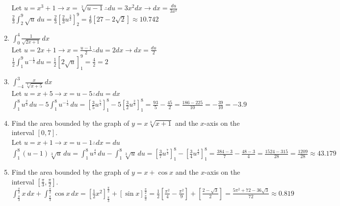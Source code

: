 \documentclass[10pt, letterpaper]{report}
\begin{document}
\begin{enumerate}
    Let $u=x^{3}+1\rightarrow x=\sqrt[3]{u-1}\therefore du=3x^{2}dx\rightarrow dx=\frac{du}{3x^2}$ \\

    $\frac{2}{3}\int_{2}^{9}{\sqrt{u}}\,du=
    \frac{2}{3}[\frac{2}{3}u^{\frac{3}{2}}]_{2}^{9}=
    \frac{4}{9}[27-2\sqrt{2}]\approx10.742$ \\

  \item{$\int_{0}^{4}\frac{1}{\sqrt{2x+1}}\,dx$} \\

    Let $u=2x+1\rightarrow x=\frac{u-1}{2}\therefore du=2dx\rightarrow dx=\frac{du}{2}$ \\
    $\frac{1}{2}\int_{1}^{9}{u^{-\frac{1}{2}}}\,du=
    \frac{1}{2}[2\sqrt{u}]_{1}^{9}=
    \frac{4}{2}=2$ \\

  \item{$\int_{-4}^{3}{\frac{x}{\sqrt[3]{x+5}}}\,dx$} \\

    Let $u=x+5\rightarrow x=u-5\therefore du=dx$ \\

    $\int_{1}^{8}{u^{\frac{2}{3}}}\,du-5\int_{1}^{8}{u^{-\frac{1}{3}}}\,du=
    [\frac{3}{5}u^{\frac{5}{3}}]_{1}^{8}-5[\frac{3}{2}u^{\frac{2}{3}}]_{1}^{8}=
    \frac{93}{5}-\frac{45}{2}=\frac{186-225}{10}=-\frac{39}{10}=-3.9$ \\

\hline
  \item{Find the area bounded by the graph of $y=x\sqrt[3]{x+1}$ and the $x$-axis on the interval $[0,7]$.} \\

    Let $u=x+1\rightarrow x=u-1\therefore dx=du$ \\

    $\int_{1}^{8}{(u-1)\sqrt[3]{u}}\,du=
    \int_{1}^{8}{u^{\frac{4}{3}}}\,du-\int_{1}^{8}{\sqrt[3]{u}}\,du=
    [\frac{3}{7}u^{\frac{7}{3}}]_{1}^{8}-[\frac{3}{4}u^{\frac{4}{3}}]_{1}^{8}=
    \frac{384-3}{7}-\frac{48-3}{4}=\frac{1524-315}{28}=\frac{1209}{28}\approx43.179$ \\

  \item{Find the area bounded by the graph of $y=x+\cos{x}$ and the $x$-axis on the interval $[\frac{\pi}{3},\frac{\pi}{2}]$.} \\

    $\int_{\frac{\pi}{3}}^{\frac{\pi}{2}}{x}\,dx+\int_{\frac{\pi}{3}}^{\frac{\pi}{2}}{\cos{x}}\,dx=
    [\frac{1}{2}x^{2}]_{\frac{\pi}{3}}^{\frac{\pi}{2}}+[\sin{x}]_{\frac{\pi}{3}}^{\frac{\pi}{2}}=
    \frac{1}{2}[\frac{\pi^{2}}{4}-\frac{\pi^{2}}{9}]+[\frac{2-\sqrt{3}}{2}]=
    \frac{5\pi^{2}+72-36\sqrt{3}}{72}\approx0.819$ \\


\end{enumerate}
\end{document}
